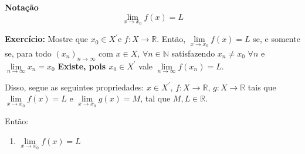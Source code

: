 \documentclass[12pt]{article}
\begin{document}
    \textbf{Notação}
    \begin{equation*}
        \lim \limits_{x \to x_0} f(x) = L
    \end{equation*}

    \textbf{Exercício: } Mostre que $x_0 \in X^{\prime}$e $f: X \to \mathbb{R}$. Então, $\lim \limits_{x \to x_0} f(x) = L$ se, e somente se, para todo $\left(x_n\right)_{n \to \infty}$ com $x \in X$, $\forall n \in \mathbb{N}$ satisfazendo $x_n \neq x_0$ $\forall n$ e $\lim \limits_{n \to \infty} x_n = x_0$ \textbf{Existe, pois $x_0 \in X^{\prime}$} vale $\lim \limits_{n \to \infty} f(x_n) = L$.

    Disso, segue as seguintes propriedades:
    $x \in X^{\prime}$, $f: X \to \mathbb{R}$, $g: X \to \mathbb{R}$ tais que $\lim \limits_{x \to x_0} f(x) = L$ e $\lim \limits_{x \to x_0} g(x) = M$, tal que $M, L \in \mathbb{R}$.

    Então:
    \begin{enumerate}
        \item $\lim \limits_{x \to x_0} f(x) = L$
    \end{enumerate}

    
\end{document}
